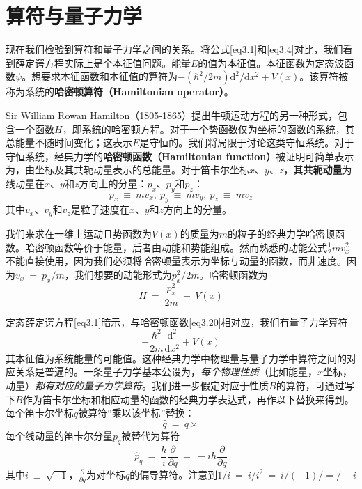 \documentclass[12pt,a4paper,openany]{ctexbook}
\begin{document}
\section{算符与量子力学}
\begin{flushleft}
    \setlength{\parindent}{2em}
现在我们检验到算符和量子力学之间的关系。将公式\eqref{eq3.1}和\eqref{eq3.4}对比，我们看到薛定谔方程实际上是个本征值问题。能量$E$的值为本征值。本征函数为定态波函数$\psi$。想要求本征函数和本征值的算符为$-(\hbar^2/2m)\mathrm{d}^2/\mathrm{d}x^2+V(x)$。该算符被称为系统的\textbf{哈密顿算符（Hamiltonian operator）}。

Sir William Rowan Hamilton（1805-1865）提出牛顿运动方程的另一种形式，包含一个函数$H$，即系统的哈密顿方程。对于一个势函数仅为坐标的函数的系统，其总能量不随时间变化；这表示$E$是守恒的。我们将局限于讨论这类守恒系统。对于守恒系统，经典力学的\textbf{哈密顿函数（Hamiltonian function）}被证明可简单表示为，由坐标及其共轭动量表示的总能量。对于笛卡尔坐标$x$、$y$、$z$，其\textbf{共轭动量}为线动量在$x$、$y$和$z$方向上的分量：$p_x$、$p_y$和$p_z$：
\begin{equation}
    \boxed{p_x\ \equiv\ mv_x,\ p_y\ \equiv\ mv_y,\ p_z\ \equiv\ mv_z}
    \label{eq3.19}
\end{equation}
其中$v_x$、$v_y$和$v_z$是粒子速度在$x$、$y$和$z$方向上的分量。

我们来求在一维上运动且势函数为$V(x)$的质量为$m$的粒子的经典力学哈密顿函数。哈密顿函数等价于能量，后者由动能和势能组成。然而熟悉的动能公式$\frac{1}{2}mv_x^2$不能直接使用，因为我们必须将哈密顿量表示为坐标与动量的函数，而非速度。因为$v_x\ =\ p_x/m$，我们想要的动能形式为$p_x^2/2m$。哈密顿函数为
\begin{equation}
    H\ =\ \frac{p_x^2}{2m}\ +\ V(x)
    \label{eq3.20}
\end{equation}

定态薛定谔方程\eqref{eq3.1}暗示，与哈密顿函数\eqref{eq3.20}相对应，我们有量子力学算符
\begin{equation*}
    -\frac{\hbar^2}{2m}\frac{\mathrm{d}^2}{\mathrm{d}x^2}+V(x)
\end{equation*}
其本征值为系统能量的可能值。这种经典力学中物理量与量子力学中算符之间的对应关系是普遍的。一条量子力学基本公设为，\textit{每个物理性质}（比如能量，$x$坐标，动量）\textit{都有对应的量子力学算符}。我们进一步假定对应于性质$B$的算符，可通过写下$B$作为笛卡尔坐标和相应动量的函数的经典力学表达式，再作以下替换来得到。每个笛卡尔坐标$q$被算符“乘以该坐标”替换：
\begin{equation*}
    \hat{q}\ =\ q\times
\end{equation*}
每个线动量的笛卡尔分量$p_q$被替代为算符
\begin{equation*}
    \hat{p}_q\ =\ \frac{\hbar}{i}\frac{\partial}{\partial q}\ =\ -i\hbar\frac{\partial}{\partial q}
\end{equation*}
其中$i\ \equiv\ \sqrt{-1}$，$\frac{\partial}{\partial q}$为对坐标$q$的偏导算符。注意到$1/i\ =\ i/i^2\ =\ i/(-1)/ =/ -i$


\end{flushleft}
\end{document}

